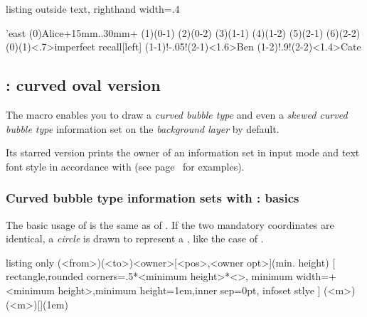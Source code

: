 \begin{tcblisting}{listing outside text, righthand width=.4\linewidth}
\begin{istgame}[scale=.9,font=\scriptsize]
\setistgrowdirection'{east}
\istroot(0){Alice}+15mm..30mm+
                  \istb \istb \endist
\istroot(1)(0-1)  \istb \istb \endist
\istroot(2)(0-2)  \istb \istb \endist
\xtdistance{10mm}{10mm}
\istroot(3)(1-1)  \istb \istb \endist
\istroot(4)(1-2)  \istb \istb \endist
\istroot(5)(2-1)  \istb \istb \endist
\istroot(6)(2-2)  \istb \istb \endist
\xtCInfoset(0)(1)<.7>{imperfect recall}[left]
\xtCInfoset(1-1)!-.05!(2-1)<1.6>{Ben}
\xtCInfoset(1-2)!.9!(2-2)<1.4>{Cate}
\end{istgame}
\end{tcblisting}


\subsection{\protect\cmd{\xtCInfosetO}: curved oval version}
\label{ssec:xtCInfosetO}

The macro \icmd{\xtCInfosetO} enables you to draw a \emph{curved bubble type}  and even a \emph{skewed curved bubble type} information set on the \emph{background layer} by default.

Its starred version \icmd{\xtCInfosetO*} prints the owner of an information set in input mode and text font style in accordance with \cmd{\setistmathTF(*)} (see page~\pageref{page:xtCInfoset*} for examples).

\subsubsection{Curved bubble type information sets with \protect\cmd{\xtCInfosetO}: basics}

The basic usage of \cmd{\xtCInfosetO} is the same as of \cmd{\xtInfosetO}.
If the two mandatory coordinates are identical, a \emph{circle} is drawn to represent a \emph{}, like the case of \cmd{\xtInfosetO}.

\begin{tcblisting}{listing only}
  (<from>)(<to>){<owner>}[<pos>,<owner opt>](min. height)
  [ rectangle,rounded corners=.5*<minimum height>*<\xtscale>,
    minimum width=+<minimum height>,minimum height=1em,inner sep=0pt,
    infoset stlye ]   %
  (<m>)(<m>){}[](1em)
\end{tcblisting}


